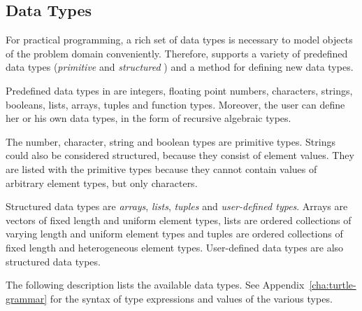 \subsection{Data Types}


For practical programming, a rich set of data types is necessary to
model objects of the problem domain conveniently.  Therefore,
\turtle{} supports a variety of predefined data types ({\em primitive} %
%
%
and
{\em structured}%
%
%
) and a method for defining new data types.

Predefined data types in \turtle{} are integers, floating point
numbers, characters, strings, booleans, lists, arrays, tuples and
function types.  Moreover, the user can define her or his own data
types, in the form of recursive algebraic types.


The number, character, string and boolean types are primitive types.
Strings could also be considered structured, because they consist of
element values.  They are listed with the primitive types because they
cannot contain values of arbitrary element types, but only characters.


Structured data types are {\em arrays}, {\em lists}, {\em tuples} and
{\em user-defined types}. Arrays are vectors of fixed length and
uniform element types, lists are ordered collections of varying length
and uniform element types and tuples are ordered collections of fixed
length and heterogeneous element types.  User-defined data types are
also structured data types.

The following description lists the available data types.  See
Appendix~\ref{cha:turtle-grammar} for the syntax of type expressions
and values of the various types.

